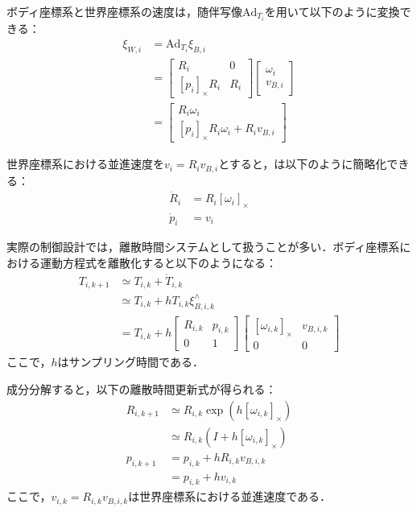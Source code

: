 ボディ座標系と世界座標系の速度は，随伴写像$\mathrm{Ad}_{T_i}$を用いて以下のように変換できる：
\begin{equation}
\begin{aligned}
\xi_{W,i} &= \mathrm{Ad}_{T_i}\xi_{B,i} \\
&= \begin{bmatrix}
R_i & 0 \\
[p_i]_\times R_i & R_i
\end{bmatrix}
\begin{bmatrix}
\omega_i \\
v_{B,i}
\end{bmatrix} \\
&= \begin{bmatrix}
R_i\omega_i \\
[p_i]_\times R_i\omega_i + R_iv_{B,i}
\end{bmatrix}
\label{eq:adjoint_map}
\end{aligned}
\end{equation}

世界座標系における並進速度を$v_i = R_iv_{B,i}$とすると，は以下のように簡略化できる：
\begin{equation}
\begin{aligned}
\dot{R}_i &= R_i[\omega_i]_\times \\
\dot{p}_i &= v_i
\label{eq:se3_dynamics_simplified}
\end{aligned}
\end{equation}

実際の制御設計では，離散時間システムとして扱うことが多い．ボディ座標系における運動方程式を離散化すると以下のようになる：
\begin{equation}
\begin{aligned}
T_{i,k+1} &\simeq T_{i,k} + \dot{T}_{i,k} \\
&\simeq T_{i,k} + h T_{i,k}\xi^\wedge_{B,i,k} \\
&= T_{i,k} + h\begin{bmatrix}
R_{i,k} & p_{i,k} \\
0 & 1
\end{bmatrix}
\begin{bmatrix}
[\omega_{i,k}]_\times & v_{B,i,k} \\
0 & 0
\end{bmatrix}
\label{eq:se3_discrete}
\end{aligned}
\end{equation}
ここで，$h$はサンプリング時間である．

成分分解すると，以下の離散時間更新式が得られる：
\begin{equation}
\begin{aligned}
R_{i,k+1} &\simeq R_{i,k}\exp(h[\omega_{i,k}]_{\times}) \\
&\simeq R_{i,k}(I + h[\omega_{i,k}]_{\times}) \\
p_{i,k+1} &= p_{i,k} + hR_{i,k}v_{B,i,k} \\
&= p_{i,k} + hv_{i,k}
\label{eq:se3_discrete_components}
\end{aligned}
\end{equation}
ここで，$v_{i,k} = R_{i,k}v_{B,i,k}$は世界座標系における並進速度である．

